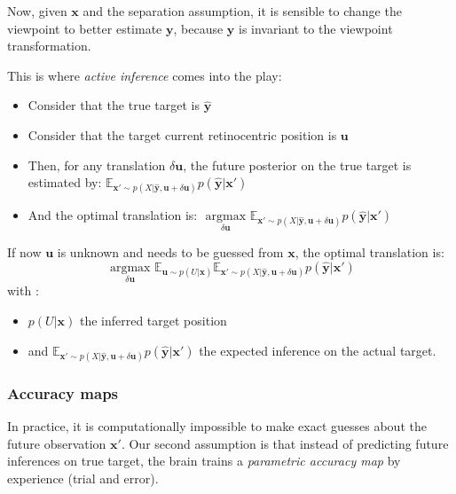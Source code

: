 Now, given $\boldsymbol{x}$ and the separation assumption, it is sensible to change the viewpoint to better estimate $\boldsymbol{y}$, because  $\boldsymbol{y}$ is invariant to the viewpoint transformation.

This is where \emph{active inference} comes into the play:
\begin{itemize}
\item Consider that the true target is $\hat{\boldsymbol{y}}$
\item Consider that the target current retinocentric position is $\boldsymbol{u}$
\item Then, for any translation $\delta \boldsymbol{u}$, the future posterior on the true target is estimated by:
$\mathbb{E}_{\boldsymbol{x}'\sim p(X|\hat{\boldsymbol{y}}, \boldsymbol{u}+\delta \boldsymbol{u})} p(\hat{\boldsymbol{y}}|\boldsymbol{x}')$
\item And the optimal translation is:  $\underset{\delta\boldsymbol{u}}{\text{ argmax }}  \mathbb{E}_{\boldsymbol{x}'\sim p(X|\hat{\boldsymbol{y}}, \boldsymbol{u}+\delta \boldsymbol{u})} p(\hat{\boldsymbol{y}}|\boldsymbol{x}')$
\end{itemize}

If now $\boldsymbol{u}$ is unknown and needs to be guessed from $\boldsymbol{x}$, the optimal translation is:
$$\underset{\delta\boldsymbol{u}}{\text{ argmax }} \mathbb{E}_{\boldsymbol{u}\sim p(U|\boldsymbol{x})} \mathbb{E}_{\boldsymbol{x}'\sim p(X|\hat{\boldsymbol{y}}, \boldsymbol{u}+\delta \boldsymbol{u})} p(\hat{\boldsymbol{y}}|\boldsymbol{x}')$$
with :
\begin{itemize}
\item $p(U|\boldsymbol{x})$ the inferred target position
\item and $\mathbb{E}_{\boldsymbol{x}'\sim p(X|\hat{\boldsymbol{y}}, \boldsymbol{u}+\delta \boldsymbol{u})} p(\hat{\boldsymbol{y}}|\boldsymbol{x}')$ the expected inference on the actual target.
\end{itemize}

\subsubsection{Accuracy maps}

In practice, it is computationally impossible to make exact guesses about the future observation $\boldsymbol{x}'$. Our second assumption is that instead of predicting future inferences on true target, the brain trains a \emph{parametric accuracy map} by experience (trial and error).



